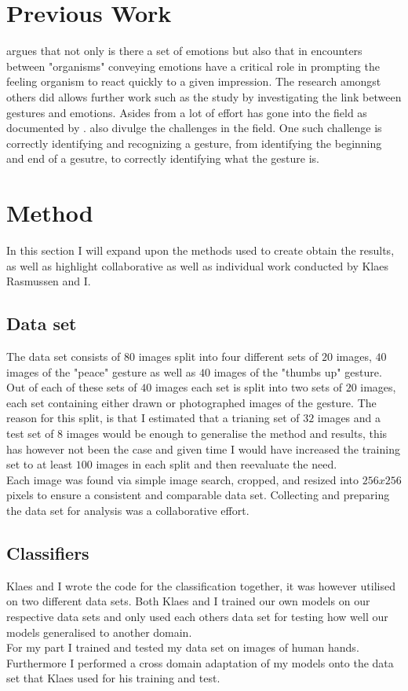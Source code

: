 \documentclass[10pt, a4paper]{article}
\begin{document}
\section{Previous Work}
 argues that not only is there a set of emotions but also that in encounters between "organisms" conveying emotions have a critical role in prompting the feeling organism to react quickly to a given impression. The research  amongst others did allows further work such as the study by  investigating the link between gestures and emotions. Asides from  a lot of effort has gone into the field as documented by .  also divulge the challenges in the field. One such challenge is correctly identifying and recognizing a gesture, from identifying the beginning and end of a gesutre, to correctly identifying what the gesture is.
\section{Method}
In this section I will expand upon the methods used to create obtain the results, as well as highlight collaborative as well as individual work conducted by Klaes Rasmussen and I.
\subsection{Data set}
The data set consists of \(80\) images split into four different sets of \(20\) images, \(40\) images of the "peace" gesture as well as \(40\) images of the "thumbs up" gesture. Out of each of these sets of \(40\) images each set is split into two sets of \(20\) images, each set containing either drawn or photographed images of the gesture. The reason for this split, is that I estimated that a trianing set of \(32\) images and a test set of \(8\) images would be enough to generalise the method and results, this has however not been the case and given time I would have increased the training set to at least \(100\) images in each split and then reevaluate the need.\\
Each image was found via simple image search, cropped, and resized into \(256x256\) pixels to ensure a consistent and comparable data set. Collecting and preparing the data set for analysis was a collaborative effort.\\
\subsection{Classifiers}
Klaes and I wrote the code for the classification together, it was however utilised on two different data sets. Both Klaes and I trained our own models on our respective data sets and only used each others data set for testing how well our models generalised to another domain.\\
For my part I trained and tested my data set on images of human hands. Furthermore I performed a cross domain adaptation of my models onto the data set that Klaes used for his training and test.\\
\end{document}
